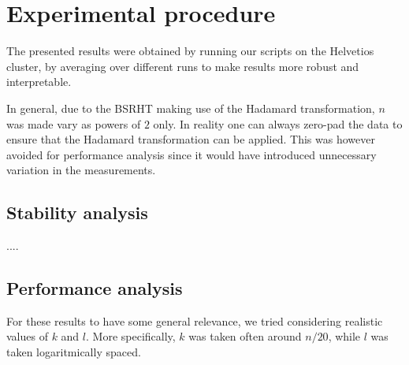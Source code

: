 \documentclass[a4paper, 12pt,oneside]{article}
\begin{document}
	\section{Experimental procedure}
		The presented results were obtained by running our scripts on the Helvetios cluster, by averaging over different runs to make results more robust and interpretable.
		
		In general, due to the BSRHT making use of the Hadamard transformation, $n$ was made vary as powers of $2$ only. In reality one can always zero-pad the data to ensure that the Hadamard transformation can be applied. This was however avoided for performance analysis since it would have introduced unnecessary variation in the measurements.  
		\subsection{Stability analysis}
		....

		\subsection{Performance analysis}
		For these results to have some general relevance, we tried considering realistic values of $k$ and $l$. More specifically, $k$ was taken often around $n/20$, while $l$ was taken logaritmically spaced.
	
\end{document}
